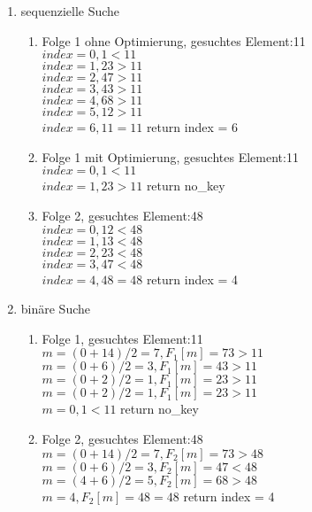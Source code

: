 \documentclass[12pt]{scrartcl}
\begin{document}
\begin{enumerate}
  \item sequenzielle Suche
    \begin{enumerate}
      \item Folge 1 ohne Optimierung, gesuchtes Element:11\\
        $index = 0, 1 < 11$ \\
        $index = 1, 23 > 11$ \\
        $index = 2, 47 > 11$ \\
        $index = 3, 43 > 11$ \\
        $index = 4, 68 > 11$ \\
        $index = 5, 12 > 11$ \\
        $index = 6, 11 = 11$ return index = 6
      \item Folge 1 mit Optimierung, gesuchtes Element:11\\
        $index = 0, 1 < 11$ \\
        $index = 1, 23 > 11$ return no\_key
      \item Folge 2, gesuchtes Element:48\\
        $index = 0, 12 < 48$ \\
        $index = 1, 13 < 48$ \\
        $index = 2, 23 < 48$ \\
        $index = 3, 47 < 48$ \\
        $index = 4, 48 = 48$  return index = 4 \\
    \end{enumerate}
  \item binäre Suche
    \begin{enumerate}
      \item Folge 1, gesuchtes Element:11\\
        $m = (0 + 14)/2 = 7, F_1[m] = 73 > 11$ \\
        $m = (0 + 6)/2 = 3, F_1[m] = 43 > 11$ \\
        $m = (0 + 2)/2 = 1, F_1[m] = 23 > 11$ \\
        $m = (0 + 2)/2 = 1, F_1[m] = 23 > 11$ \\
        $m = 0, 1 < 11$ return no\_key
      \item Folge 2, gesuchtes Element:48\\
        $m = (0 + 14)/2 = 7, F_2[m] = 73 > 48$ \\
        $m = (0 + 6)/2 = 3, F_2[m] = 47 < 48$ \\
        $m = (4 + 6)/2 = 5, F_2[m] = 68 > 48$ \\
        $m = 4, F_2[m] = 48 = 48$ return index = 4
    \end{enumerate}
\end{enumerate}
\end{document}
